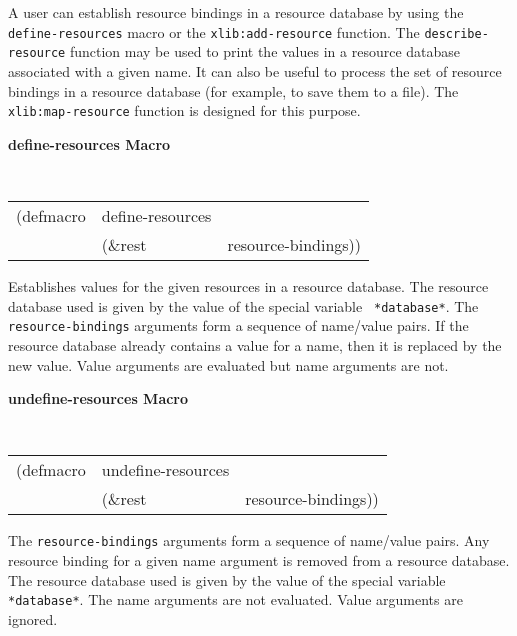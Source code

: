 A user can establish 
resource bindings in a resource database by using the {\tt define-resources}
macro or the {\tt xlib:add-resource} function.
The {\tt describe-resource} function may be used to print the values in a
resource database associated with a given name.
It can also be useful to process the set of resource bindings in a resource
database (for example, to save them to a file). The
{\tt xlib:map-resource} function is designed for this purpose.


{\large {\bf define-resources \hfill Macro}} 
\begin{flushright} \parbox[t]{6.125in}{
\tt
\begin{tabular}{lll}
\raggedright
(defmacro & define-resources & \\ 
& (\&rest & resource-bindings))
\end{tabular}
\rm

}\end{flushright}

\begin{flushright} \parbox[t]{6.125in}{
Establishes values for the given resources in a resource database. 
The resource database used is given by the value of the special variable {\tt
*database*}.
The {\tt resource-bindings} arguments form a sequence of name/value pairs.
If the resource database already contains a value for a name, then it
is replaced by the new value. Value arguments are evaluated but name
arguments are not. 
}\end{flushright}


{\large {\bf undefine-resources \hfill Macro}} 
\begin{flushright} \parbox[t]{6.125in}{
\tt
\begin{tabular}{lll}
\raggedright
(defmacro & undefine-resources & \\ 
& (\&rest & resource-bindings))
\end{tabular}
\rm

}\end{flushright}

\begin{flushright} \parbox[t]{6.125in}{
The {\tt resource-bindings} arguments form a sequence of name/value pairs.
Any resource binding for a given name argument is removed from a resource
database. The resource database used is given by the value of the special variable {\tt
*database*}.
The name arguments are not evaluated. Value arguments are
ignored.

}\end{flushright}


